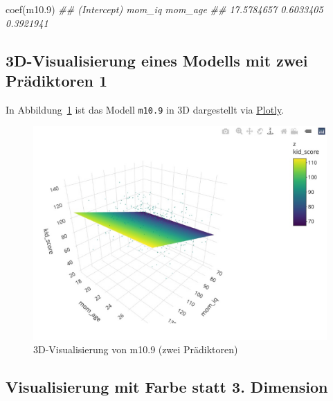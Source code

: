 \documentclass[
  a4paper,
  DIV=11]{scrreprt}
\newenvironment{Shaded}{\begin{snugshade}}{\end{snugshade}}
\newcommand{\DocumentationTok}[1]{\textcolor[rgb]{0.37,0.37,0.37}{\textit{#1}}}
\newcommand{\FloatTok}[1]{\textcolor[rgb]{0.68,0.00,0.00}{#1}}
\newcommand{\FunctionTok}[1]{\textcolor[rgb]{0.28,0.35,0.67}{#1}}
\newcommand{\NormalTok}[1]{\textcolor[rgb]{0.00,0.23,0.31}{#1}}
\theoremstyle{definition}
\theoremstyle{remark}
\begin{document}
\begin{Shaded}
\begin{Highlighting}[]
\FunctionTok{coef}\NormalTok{(m10}\FloatTok{.9}\NormalTok{)}
\DocumentationTok{\#\# (Intercept)      mom\_iq     mom\_age }
\DocumentationTok{\#\#  17.5784657   0.6033405   0.3921941}
\end{Highlighting}
\end{Shaded}

\hypertarget{d-visualisierung-eines-modells-mit-zwei-pruxe4diktoren-1}{%
\subsection{3D-Visualisierung eines Modells mit zwei Prädiktoren
1}\label{d-visualisierung-eines-modells-mit-zwei-pruxe4diktoren-1}}

In Abbildung~\ref{fig-m109-plotly} ist das Modell \texttt{m10.9} in 3D
dargestellt via \href{https://plotly.com/r/}{Plotly}.

\begin{figure}

{\centering \includegraphics[width=1\textwidth,height=\textheight]{./img/m109-plotly.jpg}

}

\caption{\label{fig-m109-plotly}3D-Visualisierung von m10.9 (zwei
Prädiktoren)}

\end{figure}

\hypertarget{visualisierung-mit-farbe-statt-3.-dimension}{%
\subsection{Visualisierung mit Farbe statt 3.
Dimension}\label{visualisierung-mit-farbe-statt-3.-dimension}}
\end{document}
